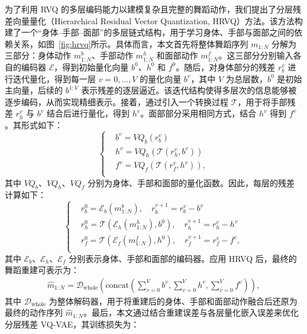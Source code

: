 为了利用 RVQ 的多层编码能力以建模复杂且完整的舞蹈动作，我们提出了分层残差向量量化（Hierarchical Residual Vector Quantization, HRVQ）方法。该方法构建了一个“身体–手部–面部”的多层链式结构，用于学习身体、手部与面部之间的依赖关系，如图~\ref{fig:hrvq}所示。具体而言，本文首先将整体舞蹈序列 $m_{1:N}$ 分解为三部分：身体动作 $m_{1:N}^b$、手部动作 $m_{1:N}^h$ 和面部动作 $m_{1:N}^f$。这三部分分别输入各自的编码器 $\mathcal{E}$，得到初始量化向量 $b^0$、$h^0$ 和 $f^0$。随后，对身体部分的残差 $r_b^v$ 进行迭代量化，得到每一层 $v = 0, \dots, V$ 的量化向量 $b^v$，其中 $V$ 为总层数，$b^0$ 是初始主向量，后续的 $b^{1:V}$ 表示残差的逐层逼近。该迭代结构使得多层次的信息能够被逐步编码，从而实现精细表示。接着，通过引入一个转换过程 $\mathcal{T}$，用于将手部残差 $r_h^v$ 与 $b^v$ 结合后进行量化，得到 $h^v$。面部部分采用相同方式，结合 $h^v$ 得到 $f^v$。其形式如下：
\begin{equation}
\left \{
\begin{aligned}
    & b^v=VQ_b(r^v_b) \\
    & h^v=VQ_h(\mathcal{T}(r^v_h, b^v)) \\
    & f^v=VQ_f(\mathcal{T}(r^v_f, h^v)) ,\\
\end{aligned}
\right.
\label{eq:hrvq_z}
\end{equation}
其中 $VQ_b$、$VQ_h$、$VQ_f$ 分别为身体、手部和面部的量化函数。因此，每层的残差计算如下：
\begin{equation}
\left \{
\begin{aligned}
     & r^0_b=\mathcal{E}_b(m_{1:N}^b), \quad r^{v+1}_b = r^v_b - b^v \\
    & r^0_h=\mathcal{T}(\mathcal{E}_h(m_{1:N}^h), b^0), \quad r^{v+1}_h = r^v_h - h^v \\
    & r^0_f=\mathcal{T}(\mathcal{E}_f(m_{1:N}^f), h^0), \quad r^{v+1}_f = r^v_f - f^v, \\
\end{aligned}
\right.
\label{eq:hrvq}
\end{equation}
其中 $\mathcal{E}_b$、$\mathcal{E}_h$、$\mathcal{E}_f$ 分别表示身体、手部和面部的编码器。应用 HRVQ 后，最终的舞蹈重建可表示为：
\begin{equation}
\begin{aligned}
    \hat{m}_{1:N} = \mathcal{D}_{\text{whole}}\left(\text{concat}\left(\sum_{v=0}^{V} b^v, \sum_{v=0}^{V} h^v, \sum_{v=0}^{V} f^v\right)\right),
\end{aligned}
\label{eq:hrvq_concat}
\end{equation}
其中 $\mathcal{D}_{\text{whole}}$ 为整体解码器，用于将重建后的身体、手部和面部动作融合后还原为最终的动作序列 $\hat{m}_{1:N}$。最后，本文通过结合重建误差与各层量化嵌入误差来优化分层残差 VQ-VAE，其训练损失为：
